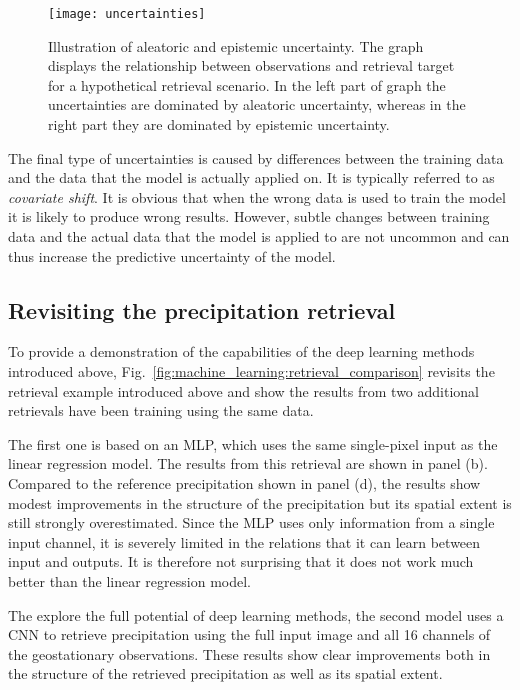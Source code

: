 \begin{figure}
  \centering
  \texttt{[image: uncertainties]}
  \caption{
    Illustration of aleatoric and epistemic uncertainty. The graph
    displays the relationship between observations and retrieval target
    for a hypothetical retrieval scenario. In the left part of graph the
    uncertainties are dominated by aleatoric uncertainty, whereas in
    the right part they are dominated by epistemic uncertainty.
  }
  \label{fig:machine_learning:uncertainties}
\end{figure}

The final type of uncertainties is caused by differences between the training
data and the data that the model is actually applied on. It is typically
referred to as \textit{covariate shift}. It is obvious that when the wrong data
is used to train the model it is likely to produce wrong results. However,
subtle changes between training data and the actual data that the model is
applied to are not uncommon and can thus increase the predictive uncertainty of
the model.

\subsection{Revisiting the precipitation retrieval}

To provide a demonstration of the capabilities of the deep learning methods
introduced above, Fig.~\ref{fig:machine_learning:retrieval_comparison} revisits
the retrieval example introduced above and show the results from two additional
retrievals have been training using the same data.

The first one is based on an MLP, which uses the same single-pixel input as the
linear regression model. The results from this retrieval are shown in panel (b).
Compared to the reference precipitation shown in panel (d), the results show
modest improvements in the structure of the precipitation but its spatial extent
is still strongly overestimated. Since the MLP  uses only information
from a single input channel, it is severely limited in the relations that it
can learn between input and outputs. It is therefore not surprising that it
does not work much better than the linear regression model.

The explore the full potential of deep learning methods, the second model uses a
CNN to retrieve precipitation using the full input image and all 16 channels of
the geostationary observations. These results show clear improvements both in
the structure of the retrieved precipitation as well as its spatial extent.

